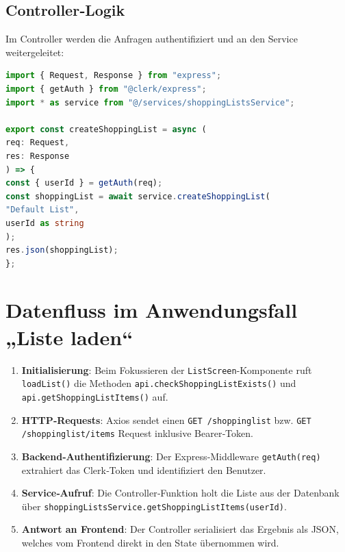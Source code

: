 \documentclass[12pt, a4paper]{report} %
\begin{document}
\subsection{Controller‑Logik}
Im Controller werden die Anfragen authentifiziert und an den Service weitergeleitet:

\begin{lstlisting}[language=TypeScript,caption={Erstellen eines Einkaufslisten‑Eintrags im Backend (\texttt{shoppingListsController.ts})}]
import { Request, Response } from "express";
import { getAuth } from "@clerk/express";
import * as service from "@/services/shoppingListsService";

export const createShoppingList = async (
req: Request,
res: Response
) => {
const { userId } = getAuth(req);
const shoppingList = await service.createShoppingList(
"Default List",
userId as string
);
res.json(shoppingList);
};
\end{lstlisting}

\section{Datenfluss im Anwendungsfall „Liste laden“}
\begin{enumerate}
\item \textbf{Initialisierung}: Beim Fokussieren der \texttt{ListScreen}-Komponente ruft \texttt{loadList()} die Methoden \texttt{api.checkShoppingListExists()} und \texttt{api.getShoppingListItems()} auf.
\item \textbf{HTTP‑Requests}: Axios sendet einen \texttt{GET /shoppinglist} bzw. \texttt{GET /shoppinglist/items} Request inklusive Bearer‑Token.
\item \textbf{Backend‑Authentifizierung}: Der Express‑Middleware \texttt{getAuth(req)} extrahiert das Clerk‑Token und identifiziert den Benutzer.
\item \textbf{Service‑Aufruf}: Die Controller‑Funktion holt die Liste aus der Datenbank über \texttt{shoppingListsService.getShoppingListItems(userId)}.
\item \textbf{Antwort an Frontend}: Der Controller serialisiert das Ergebnis als JSON, welches vom Frontend direkt in den State übernommen wird.
\end{enumerate}
\end{document}
